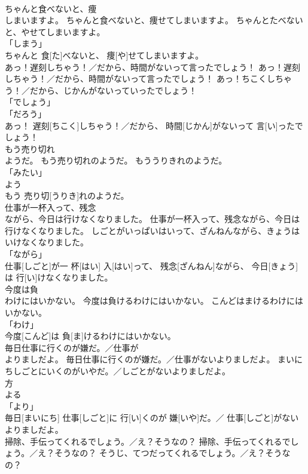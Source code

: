 \documentclass[8pt]{extreport}
\begin{document}
\begin{CJK}{UTF8}{min}
\\	ちゃんと食べないと、痩
\\	しまいますよ。	ちゃんと食べないと、痩せてしまいますよ。	ちゃんとたべないと、やせてしまいますよ。	
\\	「しまう」 
\\	ちゃんと 食[た]べないと、 痩[や]せてしまいますよ。		
\\	あっ！遅刻しちゃう！／だから、時間がないって言ったでしょう！	あっ！遅刻しちゃう！／だから、時間がないって言ったでしょう！	あっ！ちこくしちゃう！／だから、じかんがないっていったでしょう！	
\\	「でしょう」 
\\	「だろう」 
\\	あっ！ 遅刻[ちこく]しちゃう！／だから、 時間[じかん]がないって 言[い]ったでしょう！		
\\	もう売り切れ
\\	ようだ。	もう売り切れのようだ。	もううりきれのようだ。	
\\	「みたい」 
\\	よう 
\\	もう 売り切[うりき]れのようだ。		
\\	仕事が一杯入って、残念
\\	ながら、今日は行けなくなりました。	仕事が一杯入って、残念ながら、今日は行けなくなりました。	しごとがいっぱいはいって、ざんねんながら、きょうはいけなくなりました。	
\\	「ながら」 
\\	仕事[しごと]が一 杯[はい] 入[はい]って、 残念[ざんねん]ながら、 今日[きょう]は 行[い]けなくなりました。		
\\	今度は負
\\	わけにはいかない。	今度は負けるわけにはいかない。	こんどはまけるわけにはいかない。	
\\	「わけ」 
\\	今度[こんど]は 負[ま]けるわけにはいかない。		
\\	毎日仕事に行くのが嫌だ。／仕事が
\\	よりましだよ。	毎日仕事に行くのが嫌だ。／仕事がないよりましだよ。	まいにちしごとにいくのがいやだ。／しごとがないよりましだよ。	
\\	方 
\\	よる 
\\	「より」 
\\	毎日[まいにち] 仕事[しごと]に 行[い]くのが 嫌[いや]だ。／ 仕事[しごと]がないよりましだよ。		
\\	掃除、手伝ってくれるでしょう。／え？そうなの？	掃除、手伝ってくれるでしょう。／え？そうなの？	そうじ、てつだってくれるでしょう。／え？そうなの？	

\end{CJK}
\end{document}
